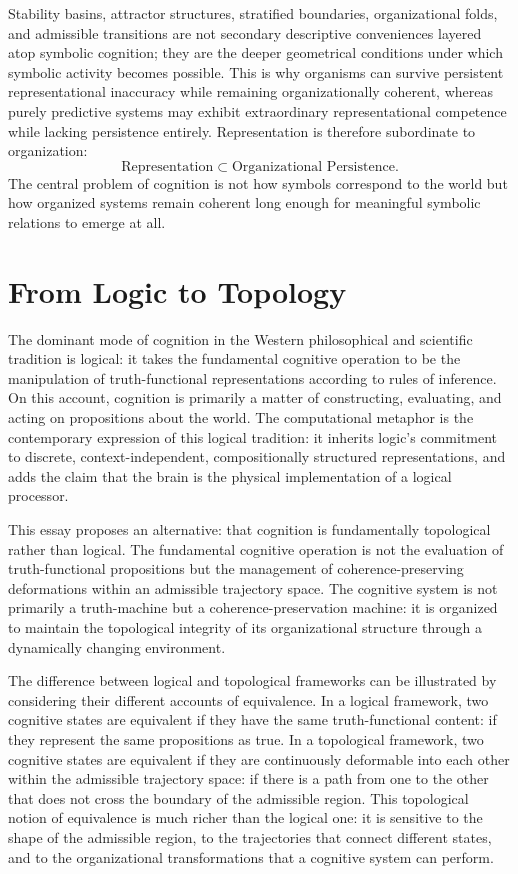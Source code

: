 \documentclass[12pt,a4paper]{report}
\theoremstyle{flyxion}
\begin{document}
Stability basins, attractor structures, stratified boundaries, organizational folds, and admissible transitions are not secondary descriptive conveniences layered atop symbolic cognition; they are the deeper geometrical conditions under which symbolic activity becomes possible. This is why organisms can survive persistent representational inaccuracy while remaining organizationally coherent, whereas purely predictive systems may exhibit extraordinary representational competence while lacking persistence entirely. Representation is therefore subordinate to organization:
\[
\text{Representation} \subset \text{Organizational Persistence}.
\]
The central problem of cognition is not how symbols correspond to the world but how organized systems remain coherent long enough for meaningful symbolic relations to emerge at all.

\section{From Logic to Topology}

The dominant mode of cognition in the Western philosophical and scientific tradition is logical: it takes the fundamental cognitive operation to be the manipulation of truth-functional representations according to rules of inference. On this account, cognition is primarily a matter of constructing, evaluating, and acting on propositions about the world. The computational metaphor is the contemporary expression of this logical tradition: it inherits logic's commitment to discrete, context-independent, compositionally structured representations, and adds the claim that the brain is the physical implementation of a logical processor.

This essay proposes an alternative: that cognition is fundamentally topological rather than logical. The fundamental cognitive operation is not the evaluation of truth-functional propositions but the management of coherence-preserving deformations within an admissible trajectory space. The cognitive system is not primarily a truth-machine but a coherence-preservation machine: it is organized to maintain the topological integrity of its organizational structure through a dynamically changing environment.

The difference between logical and topological frameworks can be illustrated by considering their different accounts of equivalence. In a logical framework, two cognitive states are equivalent if they have the same truth-functional content: if they represent the same propositions as true. In a topological framework, two cognitive states are equivalent if they are continuously deformable into each other within the admissible trajectory space: if there is a path from one to the other that does not cross the boundary of the admissible region. This topological notion of equivalence is much richer than the logical one: it is sensitive to the shape of the admissible region, to the trajectories that connect different states, and to the organizational transformations that a cognitive system can perform.
\end{document}
